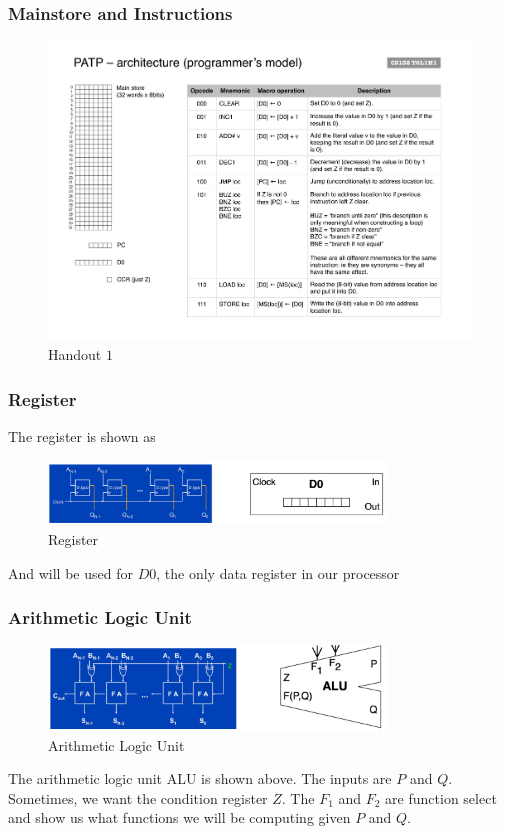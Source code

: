 \documentclass[a4paper]{article}
\theoremstyle{plain}
\theoremstyle{definition}
\theoremstyle{remark}
\begin{document}
\subsubsection{Mainstore and Instructions}
\begin{figure}[H]
	\centering
	\includegraphics[width=1\textwidth]{PATP/1.pdf}
	\caption{Handout $1$ }
\end{figure}
\subsubsection{Register}
The register is shown as
\begin{figure}[H]
	\centering
	\includegraphics[width=0.8\textwidth]{figures/register2.png}
	\caption{Register}
	\label{fig:register2}
\end{figure}
And will be used for $D 0$, the only data register in our processor
\subsubsection{Arithmetic Logic Unit}
\begin{figure}[H]
	\centering
	\includegraphics[width=0.8\textwidth]{figures/alu.png}
	\caption{Arithmetic Logic Unit}
	\label{fig:figures-alu-png}
\end{figure}
The arithmetic logic unit ALU is shown above. The inputs are $P$ and $Q$. Sometimes, we want the condition register $Z$. The $F_1$ and $F_2$ are function select and show us what functions we will be computing given $P$ and $Q$.
\end{document}
